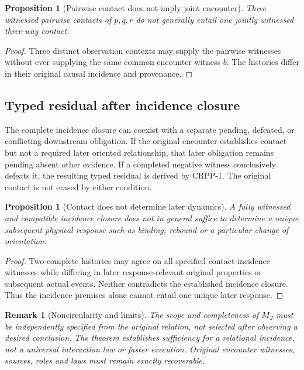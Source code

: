 \documentclass[11pt]{article}
\newtheorem{proposition}[definition]{Proposition}
\newtheorem{remark}[definition]{Remark}
\begin{document}
\begin{proposition}[Pairwise contact does not imply joint encounter]
Three witnessed pairwise contacts of $p,q,r$ do not
generally entail one jointly witnessed three-way contact.
\end{proposition}
\begin{proof}
Three distinct observation contexts may supply the
pairwise witnesses without ever supplying the same
common encounter witness $b$. The histories differ
in their original causal incidence and provenance.
\end{proof}

\subsection{Typed residual after incidence closure}
The complete incidence closure can coexist with a
separate pending, defeated, or conflicting downstream
obligation. If the original encounter establishes contact
but not a required later oriented relationship, that later
obligation remains pending absent other evidence.
If a completed negative witness conclusively defeats it,
the resulting typed residual is derived by CRPP-1.
The original contact is not erased by either condition.

\begin{proposition}[Contact does not determine later dynamics]
A fully witnessed and compatible incidence closure
does not in general suffice to determine a unique
subsequent physical response such as binding, rebound
or a particular change of orientation.
\end{proposition}
\begin{proof}
Two complete histories may agree on all specified
contact-incidence witnesses while differing in later
response-relevant original properties or subsequent
actual events. Neither contradicts the established
incidence closure. Thus the incidence premises alone
cannot entail one unique later response.
\end{proof}

\begin{remark}[Noncircularity and limits]
The scope and completeness of $M_J$ must be independently
specified from the original relation, not selected after
observing a desired conclusion. The theorem establishes
sufficiency for a \emph{relational incidence}, not a
universal interaction law or faster execution.
Original encounter witnesses, sources, roles and laws
must remain exactly recoverable.
\end{remark}
\end{document}
